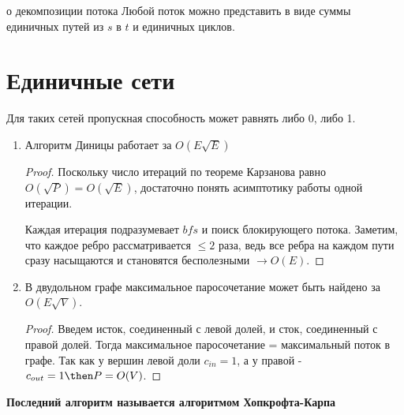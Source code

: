   \begin{proposition}{о декомпозиции потока}
    Любой поток можно представить в виде суммы единичных путей из $s$ в $t$ и единичных циклов.
  \end{proposition}

  \section{Единичные сети}

  Для таких сетей пропускная способность может равнять либо 0, либо 1. 

  \begin{enumerate}
    \item Алгоритм Диницы работает за $O(E \sqrt{E})$
    \begin{proof}
      Поскольку число итераций по теореме Карзанова равно $O(\sqrt{P}) = O(\sqrt{E})$, достаточно понять асимптотику работы одной итерации.

      Каждая итерация подразумевает $bfs$ и поиск блокирующего потока. Заметим, что каждое ребро рассматривается $\le 2$ раза, ведь все ребра на каждом пути сразу насыщаются и становятся бесполезными $\to O(E)$.
    \end{proof}

    \item В двудольном графе максимальное паросочетание может быть найдено за $O(E \sqrt{V})$.
    \begin{proof}
      Введем исток, соединенный с левой долей, и сток, соединенный с правой долей. Тогда максимальное паросочетание = максимальный поток в графе. Так как у вершин левой доли $c_{in} = 1$, а у правой - $c_{out} = 1 \then P = O(V)$.
    \end{proof}
  \end{enumerate}

  \textbf{Последний алгоритм называется алгоритмом Хопкрофта-Карпа}